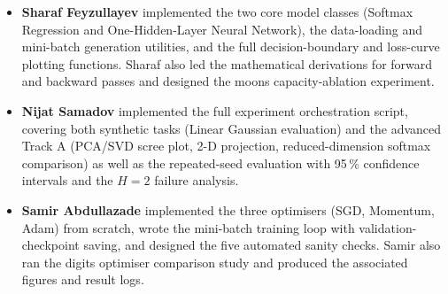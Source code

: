 \documentclass[sigconf,screen,nonacm]{acmart}
\newcommand{\1}{\mathbf{1}}
\begin{document}
\begin{itemize}[leftmargin=*]
  \item \textbf{Sharaf Feyzullayev} implemented the two core model classes
        (Softmax Regression and One-Hidden-Layer Neural Network), the
        data-loading and mini-batch generation utilities, and the full
        decision-boundary and loss-curve plotting functions.  Sharaf
        also led the mathematical derivations for forward and backward passes
        and designed the moons capacity-ablation experiment.

  \item \textbf{Nijat Samadov} implemented the full experiment orchestration
        script, covering both synthetic tasks (Linear Gaussian evaluation)
        and the advanced Track A (PCA/SVD scree plot, 2-D projection,
        reduced-dimension softmax comparison) as well as the repeated-seed
        evaluation with 95\,\% confidence intervals and the $H{=}2$ failure
        analysis.

  \item \textbf{Samir Abdullazade} implemented the three optimisers (SGD,
        Momentum, Adam) from scratch, wrote the mini-batch training loop
        with validation-checkpoint saving, and designed the five automated
        sanity checks.  Samir also ran the digits optimiser comparison study
        and produced the associated figures and result logs.

\end{itemize}
\end{document}
